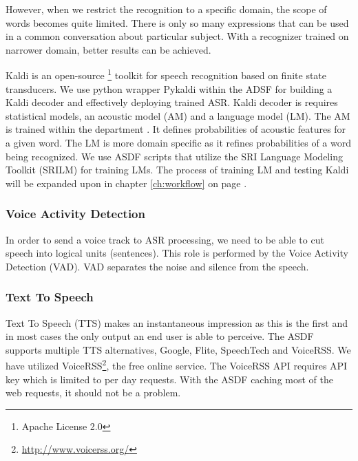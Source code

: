 However, when we restrict the recognition to a specific domain, the scope of words becomes quite limited.
There is only so many expressions that can be used in a common conversation about particular subject.
With a recognizer trained on narrower domain, better results can be achieved.


Kaldi is an open-source \footnote{Apache License 2.0} toolkit for speech recognition based on finite state transducers.
We use python wrapper Pykaldi within the ADSF for building a Kaldi decoder and effectively deploying trained ASR.
Kaldi decoder is requires statistical models, an acoustic model (AM) and a language model (LM).
The AM is trained within the department \cite{oplatek}.
It defines probabilities of acoustic features for a given word.
The LM is more domain specific as it refines probabilities of a word being recognized.
We use ASDF scripts that utilize the SRI Language Modeling Toolkit (SRILM) for training LMs.
The process of training LM and testing Kaldi will be expanded upon in chapter \ref{ch:workflow} on page \pageref{ch:workflow}.

\subsubsection{Voice Activity Detection}

In order to send a voice track to ASR processing, we need to be able to cut speech into logical units (sentences).
This role is performed by the Voice Activity Detection (VAD).
VAD separates the noise and silence from the speech.

\subsubsection{Text To Speech}

Text To Speech (TTS) makes an instantaneous impression as this is the first and in most cases the only output an end user is able to perceive. %
The ASDF supports multiple TTS alternatives, Google, Flite, SpeechTech and VoiceRSS.
We have utilized VoiceRSS\footnote{\url{http://www.voicerss.org/}}, the free online service.
The VoiceRSS API requires API key which is limited to per day requests.
With the ASDF caching most of the web requests, it should not be a problem.

